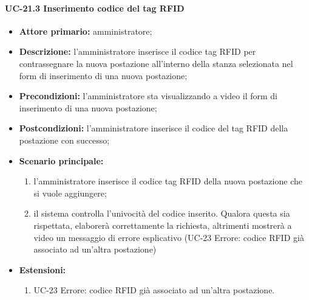  \paragraph{UC-21.3 Inserimento codice del tag RFID}
 \begin{itemize}
	\item \textbf{Attore primario:} amministratore;
	\item \textbf{Descrizione:} l'amministratore inserisce il codice tag RFID per contrassegnare la nuova postazione all'interno della stanza selezionata nel form di inserimento di una nuova postazione;
	\item \textbf{Precondizioni:} l'amministratore sta visualizzando a video il form di inserimento di una nuova postazione;
	\item \textbf{Postcondizioni:} l'amministratore inserisce il codice del tag RFID della postazione con successo;
	\item \textbf{Scenario principale:}
	      \begin{enumerate}
		      \item l'amministratore inserisce il codice tag RFID della nuova postazione che si vuole aggiungere;
		      \item il sistema controlla l'univocità del codice inserito. Qualora questa sia rispettata, elaborerà correttamente la richiesta, altrimenti mostrerà a video un messaggio di errore esplicativo (UC-23 Errore: codice RFID già associato ad un'altra postazione)
	      \end{enumerate}
	      \item \textbf{Estensioni:}
		\begin{enumerate}
		      \item UC-23 Errore: codice RFID già associato ad un'altra postazione.
	      \end{enumerate}
\end{itemize}

